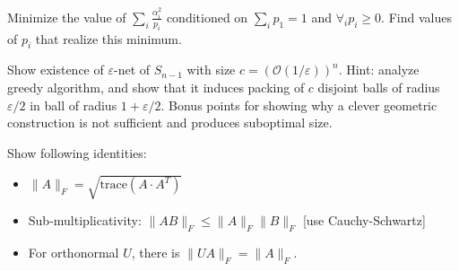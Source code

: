 \documentclass[12pt]{uebung}
\begin{document}
 

\newcommand{\bigo}{\mathcal{O}}
\renewcommand{\aufgname}{Exercise}


\begin{aufg}
Minimize the value of $\sum_{i} \frac{\alpha^2_i}{p_i}$ conditioned on $ \sum_i p_1 = 1$ and $\forall_i p_i\ge0$. Find values of $p_i$ that realize this minimum.
\end{aufg}

\begin{aufg}[2+1 pts]
Show existence of $\varepsilon$-net of $S_{n-1}$ with size $c = \left(\bigo(1/\varepsilon)\right)^{n}$. Hint: analyze greedy algorithm, and show that it induces packing of $c$ disjoint balls of radius $\varepsilon/2$ in ball of radius $1+\varepsilon/2$. Bonus points for showing why a clever geometric construction is not sufficient and produces suboptimal size.
\end{aufg}

\begin{aufg}[1+2+1]
Show following identities:
\begin{itemize}
\item $\|A\|_F = \sqrt{\textrm{trace}(A \cdot A^T)}$
\item Sub-multiplicativity: $\|A B\|_F \le \|A\|_F \|B\|_F$  [use Cauchy-Schwartz]
\item For orthonormal $U$, there is $\|UA\|_F = \|A\|_F$.
\end{itemize}
\end{aufg}
\end{document}
